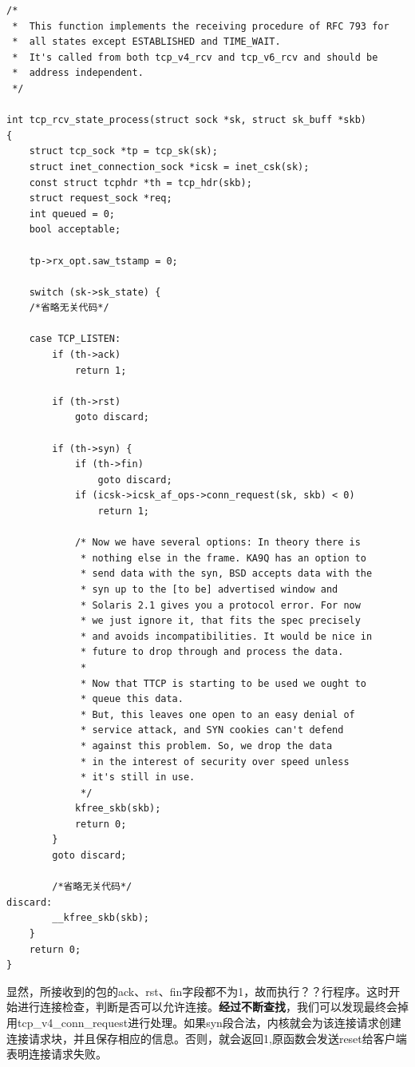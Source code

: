 \documentclass[11pt, a4paper,oneside]{book}
\theoremstyle{ocrenumbox}
\theoremstyle{purplenumbox}
\theoremstyle{blackbox}
\begin{document}
\begin{verbatim}
/*
 *  This function implements the receiving procedure of RFC 793 for
 *  all states except ESTABLISHED and TIME_WAIT.
 *  It's called from both tcp_v4_rcv and tcp_v6_rcv and should be
 *  address independent.
 */

int tcp_rcv_state_process(struct sock *sk, struct sk_buff *skb)
{
    struct tcp_sock *tp = tcp_sk(sk);
    struct inet_connection_sock *icsk = inet_csk(sk);
    const struct tcphdr *th = tcp_hdr(skb);
    struct request_sock *req;
    int queued = 0;
    bool acceptable;

    tp->rx_opt.saw_tstamp = 0;

    switch (sk->sk_state) {
    /*省略无关代码*/

    case TCP_LISTEN:
        if (th->ack)
            return 1;

        if (th->rst)
            goto discard;

        if (th->syn) {
            if (th->fin)
                goto discard;
            if (icsk->icsk_af_ops->conn_request(sk, skb) < 0)
                return 1;

            /* Now we have several options: In theory there is
             * nothing else in the frame. KA9Q has an option to
             * send data with the syn, BSD accepts data with the
             * syn up to the [to be] advertised window and
             * Solaris 2.1 gives you a protocol error. For now
             * we just ignore it, that fits the spec precisely
             * and avoids incompatibilities. It would be nice in
             * future to drop through and process the data.
             *
             * Now that TTCP is starting to be used we ought to
             * queue this data.
             * But, this leaves one open to an easy denial of
             * service attack, and SYN cookies can't defend
             * against this problem. So, we drop the data
             * in the interest of security over speed unless
             * it's still in use.
             */
            kfree_skb(skb);
            return 0;
        }
        goto discard;

        /*省略无关代码*/
discard:
        __kfree_skb(skb);
    }
    return 0;
}
\end{verbatim}

                显然，所接收到的包的ack、rst、fin字段都不为1，故而执行？？行程序。这时开始进行连接检查，判断是否可以允许连接。\textbf{经过不断查找}，我们可以发现最终会掉用tcp\_v4\_conn\_request进行处理。如果syn段合法，内核就会为该连接请求创建连接请求块，并且保存相应的信息。否则，就会返回1,原函数会发送reset给客户端表明连接请求失败。
\end{document}
